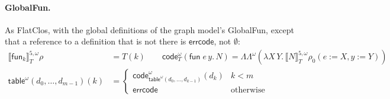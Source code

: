 \documentclass[10pt]{article}
\theoremstyle{acmplain}
\newcommand{\SEM}[1]{\llbracket #1 \rrbracket}
\newcommand{\key}[1]{\mathsf{#1}}
\newcommand{\funref}[1]{\key{fun}_{#1}}
\begin{document}
\paragraph{GlobalFun.} As FlatClos, with the global definitions of the graph
model's GlobalFun, except that a
reference to a definition that is not there is $\key{errcode}$, not
$\emptyset$:
\begin{align*}
  \SEM{\funref{k}}^{5,\omega}_T\rho &= T(k) \qquad
  \key{code}^{\omega}_T(\key{fun}\; e\,y.\,N) = \Lambda\Lambda^{\omega}(\lambda X\, Y.\, \SEM{N}^{5,\omega}_T\rho_0(e{:=}X, y{:=}Y)) \\
  \key{table}^{\omega}(d_0,\ldots,d_{m-1})(k) &=
    \begin{cases}
      \key{code}^{\omega}_{\key{table}^{\omega}(d_0,\ldots,d_{k-1})}(d_k) & k < m \\
      \key{errcode} & \text{otherwise}
    \end{cases}
\end{align*}
\end{document}
